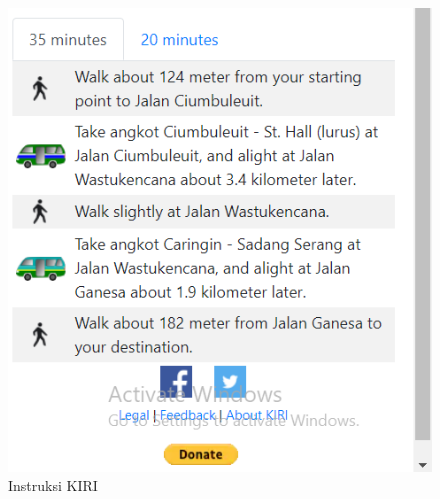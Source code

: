 \begin{figure}[H]
	\centering
	\includegraphics[scale=0.3]{Gambar/instuksi.PNG}
	\caption{Instruksi KIRI}
	\label{fig:my_label}
\end{figure}



